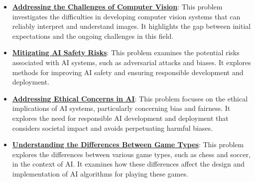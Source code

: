 \documentclass{article}%
\begin{document}
\begin{itemize}[leftmargin=*]
\item \href{\url{https://purdue.brightspace.com/d2l/common/assets/pdfjs-d2l-dist/1.0.14-legacy/web/viewer.html?file=\%252Fcontent\%252Fenforced\%252F1095467-wl.202510.CS.24300.001\%252F02L2-Intro.pdf\%253Fou\%253D1095467\&lang=en-us\&container=d2l-fileviewer-rendered-pdf\&fullscreen=d2l-fileviewer-rendered-pdf-dialog\&height=667}#page=15}{\textbf{Addressing the Challenges of Computer Vision}}: This problem investigates the difficulties in developing computer vision systems that can reliably interpret and understand images. It highlights the gap between initial expectations and the ongoing challenges in this field.%
\item \href{\url{https://purdue.brightspace.com/d2l/common/assets/pdfjs-d2l-dist/1.0.14-legacy/web/viewer.html?file=\%252Fcontent\%252Fenforced\%252F1095467-wl.202510.CS.24300.001\%252F02L2-Intro.pdf\%253Fou\%253D1095467\&lang=en-us\&container=d2l-fileviewer-rendered-pdf\&fullscreen=d2l-fileviewer-rendered-pdf-dialog\&height=667}#page=19}{\textbf{Mitigating AI Safety Risks}}: This problem examines the potential risks associated with AI systems, such as adversarial attacks and biases. It explores methods for improving AI safety and ensuring responsible development and deployment.%
\item \href{\url{https://purdue.brightspace.com/d2l/common/assets/pdfjs-d2l-dist/1.0.14-legacy/web/viewer.html?file=\%252Fcontent\%252Fenforced\%252F1095467-wl.202510.CS.24300.001\%252F02L2-Intro.pdf\%253Fou\%253D1095467\&lang=en-us\&container=d2l-fileviewer-rendered-pdf\&fullscreen=d2l-fileviewer-rendered-pdf-dialog\&height=667}#page=20}{\textbf{Addressing Ethical Concerns in AI}}: This problem focuses on the ethical implications of AI systems, particularly concerning bias and fairness. It explores the need for responsible AI development and deployment that considers societal impact and avoids perpetuating harmful biases.%
\item \href{\url{https://purdue.brightspace.com/d2l/common/assets/pdfjs-d2l-dist/1.0.14-legacy/web/viewer.html?file=\%252Fcontent\%252Fenforced\%252F1095467-wl.202510.CS.24300.001\%252F02L2-Intro.pdf\%253Fou\%253D1095467\&lang=en-us\&container=d2l-fileviewer-rendered-pdf\&fullscreen=d2l-fileviewer-rendered-pdf-dialog\&height=667}#page=27}{\textbf{Understanding the Differences Between Game Types}}: This problem explores the differences between various game types, such as chess and soccer, in the context of AI. It examines how these differences affect the design and implementation of AI algorithms for playing these games.%

\end{itemize}
\end{document}
